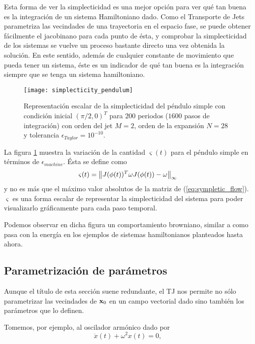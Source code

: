 Esta forma de ver la simplecticidad es una mejor opción para ver qué tan buena es la integración de un sistema Hamiltoniano dado. Como el Transporte de Jets parametriza las vecindades de una trayectoria en el espacio fase, se puede obtener fácilmente el jacobinano para cada punto de ésta, y comprobar la simplecticidad de los sistemas se vuelve un proceso bastante directo una vez obtenida la solución. En este sentido, además de cualquier constante de movimiento que pueda tener un sistema, éste es un indicador de qué tan buena es la integración siempre que se tenga un sistema hamiltoniano.

\begin{figure}[h!]
 \centering
 \texttt{[image: simplecticity\_pendulum]}
 \caption{Representación escalar de la simplecticidad del péndulo simple con condición inicial $( \pi/2,0)^T$ para $200$ periodos ($1600 $ pasos de integración) con orden del jet $M=2$, orden de la expansión $N = 28$ y tolerancia $\epsilon_{Taylor} = 10^{-10}$.}
 \label{fig:simplecticity_pendulum}
\end{figure}

La figura \ref{fig:simplecticity_pendulum} muestra la variación de la cantidad $\varsigma(t)$ para el péndulo simple en términos de $\epsilon_{machine}$. Ésta se define como
\begin{equation}
 \varsigma(t) = \left\lVert J(\phi(t))^T \omega J(\phi(t)) - \omega \right\rVert_\infty
 \label{eq:scalar_symplecticity}
\end{equation}
y no es más que el máximo valor absolutos de la matriz de (\ref{eq:sympletic_flow}). $\varsigma$ es una forma escalar de representar la simplecticidad del sistema para poder visualizarlo gráficamente para cada paso temporal.
  
Podemos observar en dicha figura un comportamiento browniano, similar a como pasa con la energía en los ejemplos de sistemas hamiltonianos planteados hasta ahora.


\subsection{Parametrización de parámetros}
\label{sec:parameter_variation}
Aunque el título de esta sección suene redundante, el TJ nos permite no sólo parametrizar las vecindades de $\mathbf{x}_0$ en un campo vectorial dado sino también los parámetros que lo definen.

Tomemos, por ejemplo, al oscilador armónico dado por  
\begin{equation}
 \ddot{x}(t) + \omega^2 x(t) = 0,
 \label{eq:one_dim_oscil}
\end{equation}


